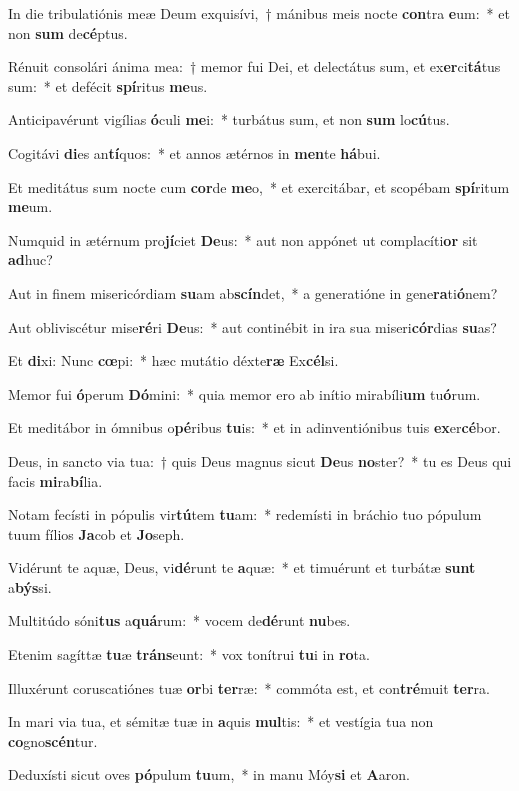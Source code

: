 \item In die tribulatiónis meæ Deum exquisívi,~† mánibus meis nocte \textbf{con}tra \textbf{e}um:~* et non \textbf{sum} de\textbf{cé}ptus.
\item Rénuit consolári ánima mea:~† memor fui Dei, et delectátus sum, et ex\textbf{er}ci\textbf{tá}tus sum:~* et defécit \textbf{spí}ritus \textbf{me}us.
\item Anticipavérunt vigílias \textbf{ó}culi \textbf{me}i:~* turbátus sum, et non \textbf{sum} lo\textbf{cú}tus.
\item Cogitávi \textbf{di}es an\textbf{tí}quos:~* et annos ætérnos in \textbf{men}te \textbf{há}bui.
\item Et meditátus sum nocte cum \textbf{cor}de \textbf{me}o,~* et exercitábar, et scopébam \textbf{spí}ritum \textbf{me}um.
\item Numquid in ætérnum pro\textbf{jí}ciet \textbf{De}us:~* aut non appónet ut complacíti\textbf{or} sit \textbf{ad}huc?
\item Aut in finem misericórdiam \textbf{su}am ab\textbf{scín}det,~* a generatióne in gene\textbf{ra}ti\textbf{ó}nem?
\item Aut obliviscétur mise\textbf{ré}ri \textbf{De}us:~* aut continébit in ira sua miseri\textbf{cór}dias \textbf{su}as?
\item Et \textbf{di}xi: Nunc \textbf{cœ}pi:~* hæc mutátio déxte\textbf{ræ} Ex\textbf{cél}si.
\item Memor fui \textbf{ó}perum \textbf{Dó}mini:~* quia memor ero ab inítio mirabíli\textbf{um} tu\textbf{ó}rum.
\item Et meditábor in ómnibus o\textbf{pé}ribus \textbf{tu}is:~* et in adinventiónibus tuis \textbf{ex}er\textbf{cé}bor.
\item Deus, in sancto via tua:~† quis Deus magnus sicut \textbf{De}us \textbf{no}ster?~* tu es Deus qui facis \textbf{mi}ra\textbf{bí}lia.
\item Notam fecísti in pópulis vir\textbf{tú}tem \textbf{tu}am:~* redemísti in bráchio tuo pópulum tuum fílios \textbf{Ja}cob et \textbf{Jo}seph.
\item Vidérunt te aquæ, Deus, vi\textbf{dé}runt te \textbf{a}quæ:~* et timuérunt et turbátæ \textbf{sunt} a\textbf{býs}si.
\item Multitúdo sóni\textbf{tus} a\textbf{quá}rum:~* vocem de\textbf{dé}runt \textbf{nu}bes.
\item Etenim sagíttæ \textbf{tu}æ \textbf{tráns}eunt:~* vox tonítrui \textbf{tu}i in \textbf{ro}ta.
\item Illuxérunt coruscatiónes tuæ \textbf{or}bi \textbf{ter}ræ:~* commóta est, et con\textbf{tré}muit \textbf{ter}ra.
\item In mari via tua, et sémitæ tuæ in \textbf{a}quis \textbf{mul}tis:~* et vestígia tua non \textbf{co}gno\textbf{scén}tur.
\item Deduxísti sicut oves \textbf{pó}pulum \textbf{tu}um,~* in manu Móy\textbf{si} et \textbf{A}aron.
